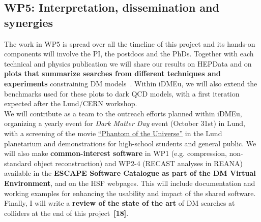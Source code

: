 \subsection{WP5: Interpretation, dissemination and synergies}

The work in WP5 is spread over all the timeline of this project and its hands-on components will involve the PI, the postdocs and the PhDs.
Together with each technical and physics publication we will share our results on HEPData and on \textbf{plots that summarize searches from different techniques and experiments} constraining DM models~\cite{ATLASSummary}. 
Within iDMEu, we will also extend the benchmarks used for these plots to dark QCD models, with a first iteration expected after the Lund/CERN workshop. \\
We will contribute as a team to the outreach efforts planned within iDMEu, organizing a yearly event for \textit{Dark Matter Day} event (October 31st) in Lund, with a screening of the movie \href{http://phantomoftheuniverse.com}{``Phantom of the Universe''} in the Lund planetarium and demonstrations for high-school students and general public. 
We will also make \textbf{common-interest software} in WP1 (e.g. compression, non-standard object reconstruction) and WP2-4 (RECAST analyses in REANA) available in the \textbf{ESCAPE Software Catalogue as part of the DM Virtual Environment}, and on the HSF webpages. 
This will include documentation and working examples for enhancing the usability and impact of the shared software. \\
Finally, I will write a \textbf{review of the state of the art} of DM searches at colliders at the end of this project~\textbf{[18]}. 




